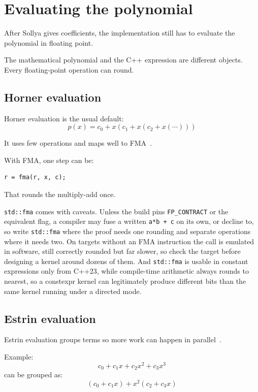 \documentclass[manuscript, nonacm]{acmart}
\begin{document}


  \section{Evaluating the polynomial}

  After Sollya gives coefficients, the implementation still has to evaluate
  the polynomial in floating point.

  The mathematical polynomial and the C++ expression are different objects.
  Every floating-point operation can round.

  \subsection{Horner evaluation}

  Horner evaluation is the usual default:
  \[ p(x) = c_0 + x(c_1 + x(c_2 + x(\cdots))) \]

  It uses few operations and maps well to FMA~\cite{muller,handbook}.

  With FMA, one step can be:
  \begin{lstlisting}[style=cpp]
r = fma(r, x, c);
  \end{lstlisting}

  That rounds the multiply-add once.

  \texttt{std::fma} comes with caveats. Unless the build pins
  \texttt{FP\_CONTRACT} or the equivalent flag, a compiler may fuse a
  written \texttt{a*b + c} on its own, or decline to, so write
  \texttt{std::fma} where the proof needs one rounding and separate
  operations where it needs two. On targets without an FMA instruction
  the call is emulated in software, still correctly rounded but far
  slower, so check the target before designing a kernel around dozens of
  them. And \texttt{std::fma} is usable in constant expressions only
  from C++23, while compile-time arithmetic always rounds to nearest, so
  a constexpr kernel can legitimately produce different bits than the
  same kernel running under a directed mode.

  \subsection{Estrin evaluation}

  Estrin evaluation groups terms so more work can happen in
  parallel~\cite{handbook}.

  Example:
  \[ c_0 + c_1 x + c_2 x^2 + c_3 x^3 \]
  can be grouped as:
  \[ (c_0 + c_1 x) + x^2(c_2 + c_3 x) \]
\end{document}
